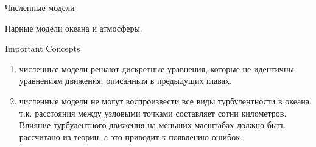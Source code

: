 \begin{chapter}{Численные модели}
\begin{section}{Парные модели океана и атмосферы.}
\end{section}

\begin{section}{Important Concepts}
\begin{enumerate}


\item
численные модели решают дискретные уравнения, которые не идентичны
уравнениям движения, описанным в предыдущих главах.
%

\item
численные модели не могут воспроизвести все виды турбулентности в
океана, т.к. расстояния между узловыми точками составляет сотни
километров. Влияние турбулентного движения на меньших масштабах должно
быть рассчитано из теории, а это приводит к появлению ошибок.
%


\end{enumerate}
\end{section}
\end{chapter}
